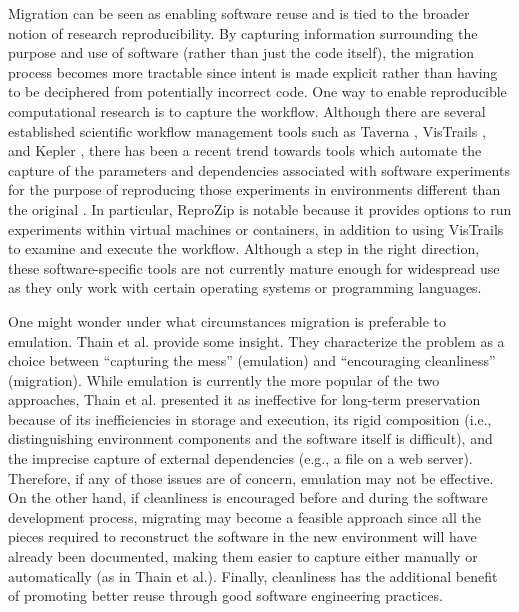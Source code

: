 \documentclass[letterpaper,11pt]{article}
\begin{document}
Migration can be seen as enabling software reuse and is tied to the broader notion of research reproducibility. By capturing information surrounding the purpose and use of software (rather than just the code itself), the migration process becomes more tractable since intent is made explicit rather than having to be deciphered from potentially incorrect code. One way to enable reproducible computational research is to capture the workflow. Although there are several established scientific workflow management tools such as Taverna \citep{wolstencroft2013}, VisTrails \citep{callahan2006}, and Kepler \citep{altintas2004}, there has been a recent trend towards tools which automate the capture of the parameters and dependencies associated with software experiments for the purpose of reproducing those experiments in environments different than the original \citep{thain2015,murta2014,mcphillips2015,chirigati2013}. In particular, ReproZip \citep{chirigati2013} is notable because it provides options to run experiments within virtual machines or containers, in addition to using VisTrails to examine and execute the workflow. Although a step in the right direction, these software-specific tools are not currently mature enough for widespread use as they only work with certain operating systems or programming languages.

One might wonder under what circumstances migration is preferable to emulation. Thain et al. \citep{thain2015} provide some insight. They characterize the problem as a choice between ``capturing the mess'' (emulation) and ``encouraging cleanliness'' (migration). While emulation is currently the more popular of the two approaches, Thain et al. presented it as ineffective for long-term preservation because of its inefficiencies in storage and execution, its rigid composition (i.e., distinguishing environment components and the software itself is difficult), and the imprecise capture of external dependencies (e.g., a file on a web server). Therefore, if any of those issues are of concern, emulation may not be effective. On the other hand,  if cleanliness is encouraged before and during the software development process, migrating may become a feasible approach since all the pieces required to reconstruct the software in the new environment will have already been documented, making them easier to capture either manually or automatically (as in Thain et al.). Finally, cleanliness has the additional benefit of promoting better reuse through good software engineering practices.
\end{document}
